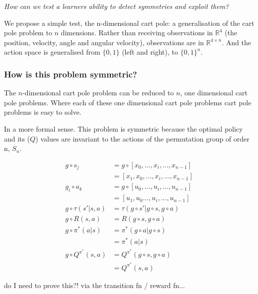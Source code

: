 \begin{displayquote}
  \textit{How can we test a learners ability to detect symmetries and exploit them?}
\end{displayquote}

We propose a simple test, the n-dimensional cart pole: a generalisation of the
cart pole problem to $n$ dimensions. Rather than receiving observations in
$\mathbb{R}^4$ (the position, velocity, angle and angular velocity), observations are
in $\mathbb{R}^{4\times n}$. And the action space is generalised from $\{0,1\}$ (left and right),
to $\{0,1\}^{n}$.


\subsubsection{How is this problem symmetric?}

The $n$-dimensional cart pole problem can be reduced to $n$, one dimensional cart pole problems.
Where each of these one dimensional cart pole problems cart pole problems is easy to solve.

In a more formal sense. This problem is symmetric because the optimal policy and its ($Q$) values are invariant to the actions of the permutation group of order n, $S_n$.

\begin{align*}
g \circ s_j &= g \circ [x_0, \dots, x_i, \dots, x_{n-1}] \\
&= [x_1, x_0, \dots, x_i, \dots, x_{n-1}] \\
g_i \circ a_k &= g \circ [u_0, \dots, u_i, \dots, u_{n-1}] \\
&= [u_1, u_0 \dots, u_i, \dots, u_{n-1}] \\
g\circ \tau(s'|s, a) &= \tau(g\circ s'|g\circ s, g\circ a) \\
g\circ R(s, a) &= R(g\circ s, g\circ a) \\
g\circ \pi^{* }(a|s) &= \pi^{* }(g\circ a| g\circ s) \\
&= \pi^{* }(a|s) \tag{invariance of the optimal policy}\\
g\circ Q^{\pi^{* }}(s, a) &= Q^{\pi^{* }}(g\circ s, g\circ a) \\
&= Q^{\pi^{* }}(s, a) \tag{invariance of the optimal values}
\end{align*}

{\color{red}do I need to prove this?! via the transition fn / reward fn...}

